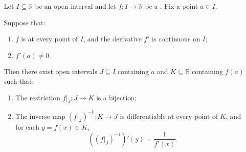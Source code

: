 \begin{theorem} \label{theorem:inverse_function_theorem_for_real_valued_functions_with_nonvanishing_derivative}
    Let $I \subseteq \mathbb{R}$ be an open interval and let $f : I \to \mathbb{R}$ be a . Fix a point $a \in I$.

    Suppose that:
    \begin{enumerate}
        \item $f$ is  at every point of $I$, and the derivative $f'$ is continuous on $I$;
        \item $f'(a) \neq 0$.
    \end{enumerate}
    Then there exist open intervals $J \subseteq I$ containing $a$ and $K \subseteq \mathbb{R}$ containing $f(a)$ such that:
    \begin{enumerate}
        \item The restriction $f|_J : J \to K$ is a bijection;
        \item The inverse map $(f|_J)^{-1} : K \to J$ is differentiable at every point of $K$, and for each $y = f(x) \in K$,
        $$\left((f|_J)^{-1}\right)'(y) = \frac{1}{f'(x)}.$$
    \end{enumerate}
\end{theorem}
